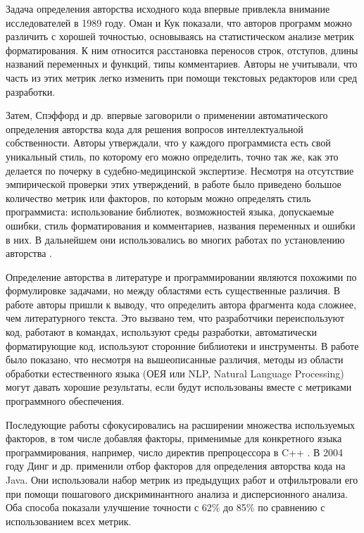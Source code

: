 Задача определения авторства исходного кода впервые привлекла внимание исследователей в 1989 году. Оман и Кук \cite{Oman1989} показали, что авторов программ можно различить с хорошей точностью, основываясь на статистическом анализе метрик форматирования. К ним относится расстановка переносов строк, отступов, длины названий переменных и функций, типы комментариев. Авторы не учитывали, что часть из этих метрик легко изменить при помощи текстовых редакторов или сред разработки.

Затем, Спэффорд и др. \cite{Spafford1993} впервые заговорили о применении автоматического определения авторства кода для решения вопросов интеллектуальной собственности. Авторы утверждали, что у каждого программиста есть свой уникальный стиль, по которому его можно определить, точно так же, как это делается по почерку в судебно-медицинской экспертизе. Несмотря на отсутствие эмпирической проверки этих утверждений, в работе было приведено большое количество метрик или факторов, по которым можно определять стиль программиста: использование библиотек, возможностей языка, допускаемые ошибки, стиль форматирования и комментариев, названия переменных и ошибки в них. В дальнейшем они использовались во многих работах по установлению авторства \cite{Macdonell1999,Ding2004,Lange2007,Kothari2007,Caliskan2015,Yang2017}.

Определение авторства в литературе и программировании являются похожими по формулировке задачами, но между областями есть существенные различия. В работе \cite{Krsul1997} авторы пришли к выводу, что определить автора фрагмента кода сложнее, чем литературного текста. Это вызвано тем, что разработчики переиспользуют код, работают в командах, используют среды разработки, автоматически форматирующие код, используют сторонние библиотеки и инструменты. В работе \cite{Sallis1996} было показано, что несмотря на вышеописанные различия, методы из области обработки естественного языка (ОЕЯ или NLP, Natural Language Processing) могут давать хорошие результаты, если будут использованы вместе с метриками программного обеспечения.

Последующие работы \cite{Krsul1997, Gray1998, Macdonell1999} сфокусировались на расширении множества используемых факторов, в том числе добавляя факторы, применимые для конкретного языка программирования, например, число директив препроцессора в C++ \cite{Macdonell1999}. В 2004 году Динг и др. \cite{Ding2004} применили отбор факторов для определения авторства кода на Java. Они использовали набор метрик из предыдущих работ и отфильтровали его при помощи пошагового дискриминантного анализа и дисперсионного анализа. Оба способа показали улучшение точности с 62\% до 85\% по сравнению с использованием всех метрик.


